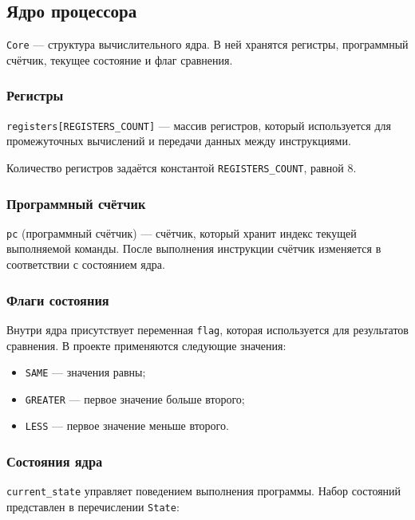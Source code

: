 \documentclass[12pt,a4paper]{article}
\begin{document}
\subsection{Ядро процессора}

\texttt{Core} --- структура вычислительного ядра. В ней хранятся регистры, программный счётчик, текущее состояние и флаг сравнения.

\subsubsection{Регистры}

\texttt{registers[REGISTERS\_COUNT]} --- массив регистров, который используется для промежуточных вычислений и передачи данных между инструкциями.

Количество регистров задаётся константой \texttt{REGISTERS\_COUNT}, равной 8.

\subsubsection{Программный счётчик}

\texttt{pc} (программный счётчик) --- счётчик, который хранит индекс текущей выполняемой команды. После выполнения инструкции счётчик изменяется в соответствии с состоянием ядра.

\subsubsection{Флаги состояния}

Внутри ядра присутствует переменная \texttt{flag}, которая используется для результатов сравнения. В проекте применяются следующие значения:

\begin{itemize}[leftmargin=1.5em]
    \item \texttt{SAME} --- значения равны;
    \item \texttt{GREATER} --- первое значение больше второго;
    \item \texttt{LESS} --- первое значение меньше второго.
\end{itemize}



\subsubsection{Состояния ядра}

\texttt{current\_state} управляет поведением выполнения программы. Набор состояний представлен в перечислении \texttt{State}:
\end{document}
